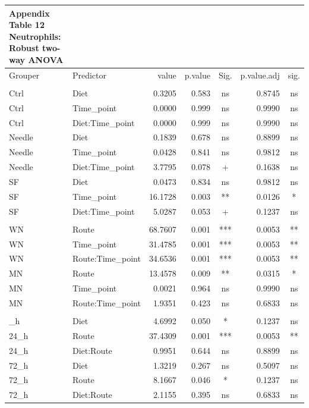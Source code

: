 \documentclass[
  12pt,
  letterpaper,
]{article}
\begin{document}
\begin{longtable}{l|lrrcrc}
\caption*{
{\large \textbf{Appendix Table 12}} \\ 
{\small \textbf{Neutrophils: Robust two-way ANOVA}}
} \\ 
\toprule
\multicolumn{1}{l}{Grouper} & Predictor & value & p.value & Sig. & p.value.adj & sig. \\ 
\midrule\addlinespace[2.5pt]
\multicolumn{7}{l}{Grouped by Route} \\ 
\midrule\addlinespace[2.5pt]
Ctrl & Diet & 0.3205 & 0.583 & ns & 0.8745 & ns \\ 
Ctrl & Time\_point & 0.0000 & 0.999 & ns & 0.9990 & ns \\ 
Ctrl & Diet:Time\_point & 0.0000 & 0.999 & ns & 0.9990 & ns \\ 
Needle & Diet & 0.1839 & 0.678 & ns & 0.8899 & ns \\ 
Needle & Time\_point & 0.0428 & 0.841 & ns & 0.9812 & ns \\ 
Needle & Diet:Time\_point & 3.7795 & 0.078 & + & 0.1638 & ns \\ 
SF & Diet & 0.0473 & 0.834 & ns & 0.9812 & ns \\ 
SF & Time\_point & 16.1728 & 0.003 & ** & 0.0126 & * \\ 
SF & Diet:Time\_point & 5.0287 & 0.053 & + & 0.1237 & ns \\ 
\midrule\addlinespace[2.5pt]
\multicolumn{7}{l}{Grouped by Diet} \\ 
\midrule\addlinespace[2.5pt]
WN & Route & 68.7607 & 0.001 & *** & 0.0053 & ** \\ 
WN & Time\_point & 31.4785 & 0.001 & *** & 0.0053 & ** \\ 
WN & Route:Time\_point & 34.6536 & 0.001 & *** & 0.0053 & ** \\ 
MN & Route & 13.4578 & 0.009 & ** & 0.0315 & * \\ 
MN & Time\_point & 0.0021 & 0.964 & ns & 0.9990 & ns \\ 
MN & Route:Time\_point & 1.9351 & 0.423 & ns & 0.6833 & ns \\ 
\midrule\addlinespace[2.5pt]
\multicolumn{7}{l}{Grouped by Time\_point} \\ 
\midrule\addlinespace[2.5pt]
24\_h & Diet & 4.6992 & 0.050 & * & 0.1237 & ns \\ 
24\_h & Route & 37.4309 & 0.001 & *** & 0.0053 & ** \\ 
24\_h & Diet:Route & 0.9951 & 0.644 & ns & 0.8899 & ns \\ 
72\_h & Diet & 1.3219 & 0.267 & ns & 0.5097 & ns \\ 
72\_h & Route & 8.1667 & 0.046 & * & 0.1237 & ns \\ 
72\_h & Diet:Route & 2.1155 & 0.395 & ns & 0.6833 & ns \\ 
\bottomrule
\end{longtable}
\end{document}

